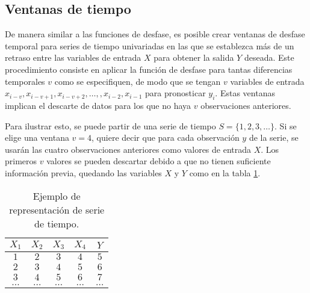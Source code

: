 \subsection{Ventanas de tiempo}

De manera similar a las funciones de desfase, es posible crear ventanas de desfase temporal para series de tiempo univariadas en las que se establezca más de un retraso entre las variables de entrada $X$ para obtener la salida $Y$ deseada. Este procedimiento consiste en aplicar la función de desfase para tantas diferencias temporales $v$ como se especifiquen, de modo que se tengan $v$ variables de entrada $x_{i-v}, x_{i - v + 1}, x_{i - v + 2}, \ldots, , x_{i - 2} , x_{i - 1}$ para pronosticar $y_i$. Estas ventanas implican el descarte de datos para los que no haya $v$ observaciones anteriores. 

Para ilustrar esto, se puede partir de una serie de tiempo $S = \{1, 2, 3, \ldots\}$. Si se elige una ventana $v = 4$, quiere decir que para cada observación $y$ de la serie, se usarán las cuatro observaciones anteriores como valores de entrada $X$. Los primeros $v$ valores se pueden descartar debido a que no tienen suficiente información previa, quedando las variables $X$ y $Y$ como en la tabla \ref{tab:window}.

\begin{table}
    \begin{center}
        \caption{Ejemplo de representación de serie de tiempo.}
        \label{tab:window}
        \begin{tabular}{| c | c | c | c | c |}
        \hline
        $X_1$ & $X_2$ & $X_3$ & $X_4$ & $Y$ \\ \hline \hline
        $1$   & $2$   & $3$   & $4$   & $5$ \\ \hline
        $2$   & $3$   & $4$   & $5$   & $6$ \\ \hline
        $3$   & $4$   & $5$   & $6$   & $7$ \\ \hline
        $\ldots$   & $\ldots$   & $\ldots$   & $\ldots$   & $\ldots$ \\ \hline
        \end{tabular}
    \end{center}
\end{table}